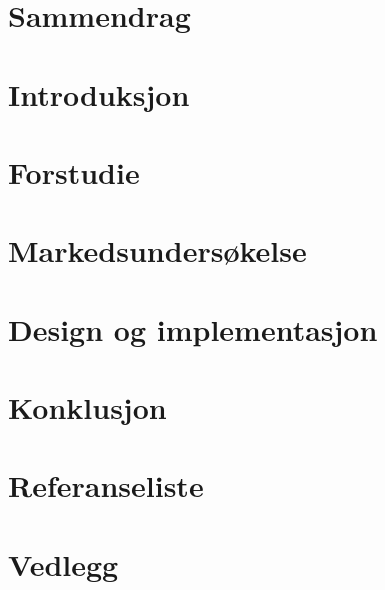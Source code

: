 \documentclass[11pt, a4paper]{report}
\newcommand{\comment}[1]{} \comment{This is a block comment wrapped in curly brackets}
\begin{document}



%
%
\chapter*{Sammendrag}

\tableofcontents
\newpage
{}



\comment{ foreløpig struktur på rapport:
Sammendrag
Innhold
Introduksjon
	Gruppen
	Initiativet
	Problemet
	Ideen
Pre study
	Mekanikk
	Hardware
	Software
Markedsundersøkelse
	generelt
	4 p'er
Løsning
	valg av løsning
	hardware
	software
		GUI
	diskusjon
Konklusjon
Referanseliste
Vedlegg
}

\chapter{Introduksjon}
	
	
	


\chapter{Forstudie}
	
	
	
	
\chapter{Markedsundersøkelse}
\chapter{Design og implementasjon}
	
	
\chapter{Konklusjon}
\chapter{Referanseliste}
\chapter{Vedlegg}
%

\newpage
{}
\listoftables
{}
\listoffigures
{}



\newpage
{} %
\appendix
%
\end{document}
